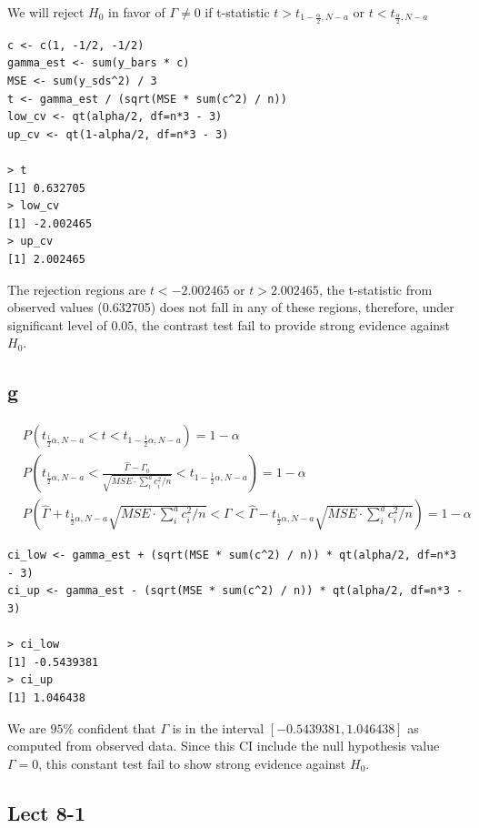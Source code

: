 \documentclass[11pt,letterpaper]{article}
\let\hat\widehat
\begin{document}
\noindent We will reject $H_0$ in favor of $\Gamma \neq 0$ if t-statistic $t > t_{1-\frac{\alpha}{2}, N-a}$ or $t < t_{\frac{\alpha}{2}, N-a}$
\begin{verbatim}
c <- c(1, -1/2, -1/2)
gamma_est <- sum(y_bars * c)
MSE <- sum(y_sds^2) / 3
t <- gamma_est / (sqrt(MSE * sum(c^2) / n))
low_cv <- qt(alpha/2, df=n*3 - 3)
up_cv <- qt(1-alpha/2, df=n*3 - 3)

> t
[1] 0.632705
> low_cv
[1] -2.002465
> up_cv
[1] 2.002465
\end{verbatim}
\noindent The rejection regions are $t < -2.002465$ or $t > 2.002465$, the t-statistic from observed values (0.632705) does not fall in any of these regions, therefore, under significant level of $0.05$, the contrast test fail to provide strong evidence against $H_0$. 

\subsection*{g}
\begin{align*}
& P(t_{\frac{1}{2} \alpha, N-a} < t < t_{ 1 - \frac{1}{2} \alpha, N-a}) = 1 - \alpha \\
& P(t_{\frac{1}{2} \alpha, N-a} < \frac{\hat{\Gamma} - \Gamma_0}{\sqrt{MSE \cdot \sum_i^a c_i^2 / n}} < t_{ 1 - \frac{1}{2} \alpha, N-a}) = 1 - \alpha \\
& P( \hat{\Gamma} + t_{\frac{1}{2} \alpha, N-a} \sqrt{MSE \cdot \sum_i^a c_i^2 / n} < \Gamma <  \hat{\Gamma} - t_{\frac{1}{2} \alpha, N-a} \sqrt{MSE \cdot \sum_i^a c_i^2 / n} ) = 1 - \alpha
\end{align*}
\begin{verbatim}
ci_low <- gamma_est + (sqrt(MSE * sum(c^2) / n)) * qt(alpha/2, df=n*3 - 3)
ci_up <- gamma_est - (sqrt(MSE * sum(c^2) / n)) * qt(alpha/2, df=n*3 - 3)

> ci_low
[1] -0.5439381
> ci_up
[1] 1.046438
\end{verbatim}
\noindent We are $95\%$ confident that $\Gamma$ is in the interval $[-0.5439381,1.046438 ]$ as computed from observed data. Since this CI include the null hypothesis value $\Gamma = 0$, this constant test fail to show strong evidence against $H_0$. 

\subsection*{Lect 8-1}
\end{document}

